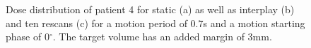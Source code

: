 \begin{figure}[H]
\begin{center}
{ }
\caption{Dose distribution of patient 4 for static (a) as well as interplay (b) and ten rescans (c) for a motion period of 0.7s and a motion 
starting phase of 0$^{\circ}$. The target volume has an added margin of 3mm.}
\label{dose_pat08}
 \end{center}
\end{figure}

\newpage

 \begin{figure}[H]
 \begin{center}
\end{center}
\end{figure}
